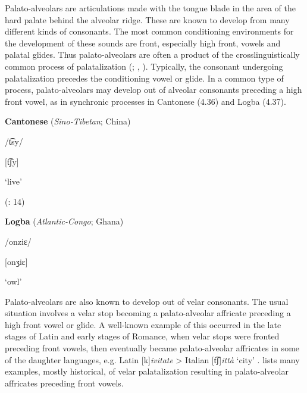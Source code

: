   Palato-alveolars are articulations made with the tongue blade in the area of the hard palate behind the alveolar ridge. These are known to develop from many different kinds of consonants. The most common conditioning environments for the development of these sounds are front, especially high front, vowels and palatal glides. Thus palato-alveolars are often a product of the crosslinguistically common process of palatalization (\citealt{Bhat1978}; \citealt{Bateman2007}, \citealt{BybeeEasterday2019}). Typically, the consonant undergoing palatalization precedes the conditioning vowel or glide. In a common type of process, palato-alveolars may develop out of alveolar consonants preceding a high front vowel, as in synchronic processes in Cantonese (4.36) and Logba (4.37).



\ea\label{ex:(4.36)}
  \textbf{Cantonese} (\textit{Sino-Tibetan}; China)



/t͡sy/



[t͡ʃy]



‘live’



(\citealt{MatthewsYip1994}: 14)

\z


\ea\label{ex:(4.37)}
  \textbf{Logba} (\textit{Atlantic-Congo}; Ghana)



/onziɛ/



[onʒiɛ]



‘owl’



\citep[18]{Dorvlo2008}


\z

  Palato-alveolars are also known to develop out of velar consonants. The usual situation involves a velar stop becoming a palato-alveolar affricate preceding a high front vowel or glide. A well-known example of this occurred in the late stages of Latin and early stages of Romance, when velar stops were fronted preceding front vowels, then eventually became palato-alveolar affricates in some of the daughter languages, e.g. Latin [k]\textit{ivitate} > Italian [t͡ʃ]\textit{ittà} ‘city’ \citep[113]{Posner1996}. \citet{Bhat1978} lists many examples, mostly historical, of velar palatalization resulting in palato-alveolar affricates preceding front vowels.



